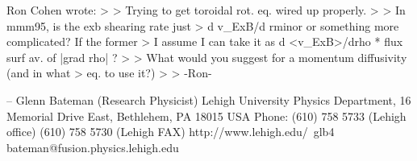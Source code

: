 Ron Cohen wrote:
> 
> Trying to get toroidal rot. eq. wired up properly.
> 
> In mmm95, is the exb shearing rate just
> d v_ExB/d rminor or something more complicated?  If the former
> I assume I can take it as d <v_ExB>/drho * flux surf av. of |grad rho| ?
> 
> What would you suggest for a momentum diffusivity (and in what
> eq. to use it?)
> 
> -Ron-

-- 
Glenn Bateman (Research Physicist)     Lehigh University
Physics Department, 16 Memorial Drive East, Bethlehem, PA 18015 USA
Phone: (610) 758 5733 (Lehigh office)  (610) 758 5730 (Lehigh FAX)
http://www.lehigh.edu/~glb4      bateman@fusion.physics.lehigh.edu

